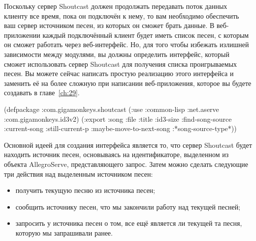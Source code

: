 Поскольку сервер Shoutcast должен продолжать передавать поток данных клиенту все время,
пока он подключён к нему, то вам необходимо обеспечить ваш сервер источником песен, из
которых он сможет брать данные.  В веб-приложении каждый подключённый клиент будет иметь
список песен, с которым он сможет работать через веб-интерфейс.  Но, для того чтобы
избежать излишней зависимости между модулями, вы должны определить интерфейс, который
сможет использовать сервер Shoutcast для получения списка проигрываемых песен. Вы можете
сейчас написать простую реализацию этого интерфейса и заменить её на более сложную при
написании веб-приложения, которое вы будете создавать в главе~\ref{ch:29}.

\vfill{}
\pagebreak{}

\begin{lrbox}{\chtwoeightone}
  \begin{minipage}{\linewidth}
\begin{myverb}
(defpackage :com.gigamonkeys.shoutcast
  (:use :common-lisp 
        :net.aserve 
        :com.gigamonkeys.id3v2)
  (:export :song
           :file
           :title
           :id3-size
           :find-song-source
           :current-song
           :still-current-p
           :maybe-move-to-next-song
           :*song-source-type*))
\end{myverb}
  \end{minipage}
\end{lrbox}


Основной идеей для создания интерфейса является то, что сервер Shoutcast будет находить
источник песен, основываясь на идентификаторе, выделенном из объекта AllegroServe,
представляющего запрос.  Затем можно сделать следующие три действия над выделенным
источником песен:
\begin{itemize}
\item получить текущую песню из источника песен;
\item сообщить источнику песен, что мы закончили работу над текущей песней;
\item запросить у источника песен о том, все ещё является ли текущей та песня, которую мы
  запрашивали ранее.
\end{itemize}

